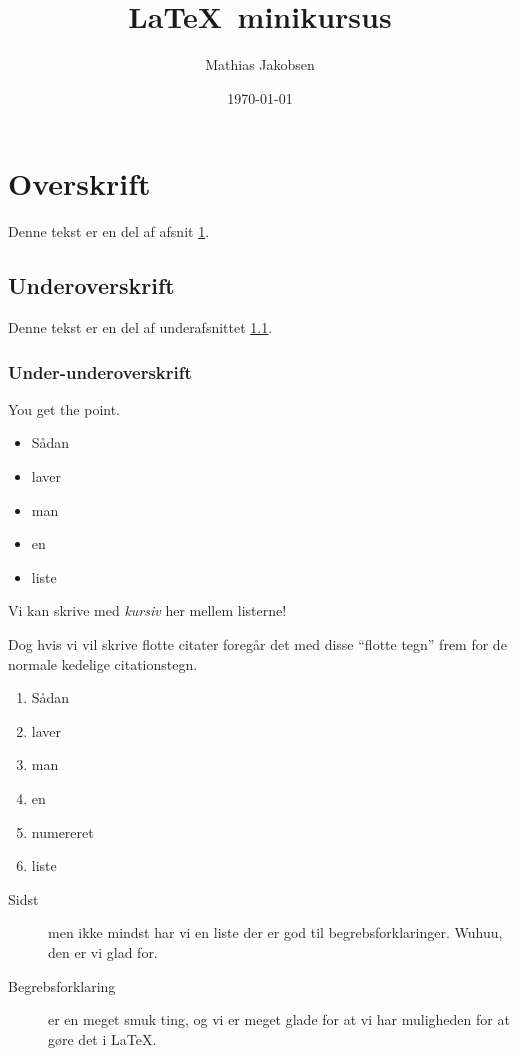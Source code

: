 \documentclass[hidelinks, 12pt]{article}
\begin{document}
	
	\title{\LaTeX\, minikursus}
	\author{Mathias Jakobsen}
	\date{\today}
	\maketitle %
	
	\section{Overskrift}
	\label{label_til_at_kende_afsnittet}
	Denne tekst er en del af afsnit \ref{label_til_at_kende_afsnittet}. %
	\subsection{Underoverskrift}
	\label{endnu_en_label_til_dette_afsnit}
	Denne tekst er en del af underafsnittet \ref{endnu_en_label_til_dette_afsnit}.
	\subsubsection{Under-underoverskrift}
	You get the point.
	\begin{itemize}
		\item Sådan
		\item laver
		\item man
		\item en
		\item liste
	\end{itemize}
	
	Vi kan skrive med \textit{kursiv} her mellem listerne!

	Dog hvis vi vil skrive flotte citater foregår det med disse ``flotte tegn'' frem for de normale kedelige citationstegn.

	\begin{enumerate}
		\item Sådan
		\item laver
		\item man
		\item en
		\item numereret
		\item liste
	\end{enumerate}

	\begin{description}
		\item[Sidst] men ikke mindst har vi en liste der er god til begrebsforklaringer. Wuhuu, den er vi glad for.
		\item[Begrebsforklaring] er en meget smuk ting, og vi er meget glade for at vi har muligheden for at gøre det i \LaTeX.
	\end{description}
\end{document}
